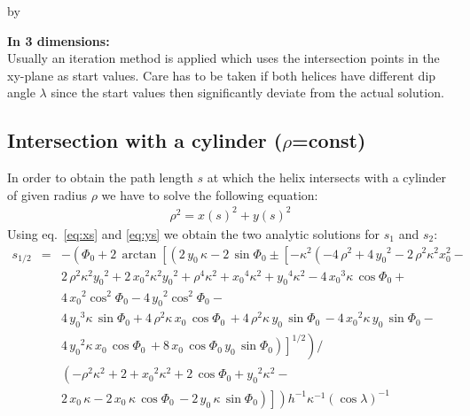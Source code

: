 \documentclass[twoside]{article}
\newcommand{\entrylabel}[1]{\mbox{\textbf{{#1}}}\hfil}%
\newenvironment{entry}
{\begin{list}{}%
    {\renewcommand{\makelabel}{\entrylabel}%
     \setlength{\labelwidth}{90pt}%
     \setlength{\leftmargin}{\labelwidth}
     \advance\leftmargin by \labelsep%
      }%
    }%
  {\end{list}}
\newcommand{\Entrylabel}[1]%
{\raisebox{0pt}[1ex][0pt]{\makebox[\labelwidth][l]%
    {\parbox[t]{\labelwidth}{\hspace{0pt}\textbf{{#1}}}}}}
\newenvironment{Entry}%
{\renewcommand{\entrylabel}{\Entrylabel}\begin{entry}}%
  {\end{entry}}
\begin{document}
\begin{description}
\begin{Entry}
{\bf In 3 dimensions:}\\
Usually an iteration method is applied which uses the intersection
points in the xy-plane as start values. Care has to be taken if both
helices have different dip angle $\lambda$ since the start values then
significantly deviate from the actual solution.

\subsection{Intersection with a cylinder ($\rho$=const)}

In order to obtain the path length $s$ at which the helix
intersects with a cylinder of given radius $\rho$ we have to solve
the following equation:
\begin{eqnarray}
    \rho^2 = x(s)^2 + y(s)^2
\end{eqnarray}
Using eq.~\ref{eq:xs} and \ref{eq:ys} we obtain the two analytic solutions for $s_1$ and $s_2$:
\begin{eqnarray} \label{eq:rsolve}
    s_{1/2} &=& -\left({\Phi_0}+2\,\arctan \left[
            \left(2\,{y_0}\,\kappa-2\,\sin{\Phi_0} \pm \left[ -
                    \kappa^2\left (-4\,\rho^2+4\,{y_0}^2 - 2\,\rho^2\kappa^2 x_0^2 -  
                    \right. \right. \right. \right. \right. \\ \nonumber
    & & \left. \left. \left. \left. \left.
                        2\,\rho^2 \kappa^2 {y_0}^{2} + 2\,{{x_0}}^{2}{\kappa}^{2}{
                            {y_0}}^{2}+{\rho}^{4}{\kappa}^{2}+{{x_0}}^{4}{\kappa}^{2}+{{y_0}}^{4}{
                            \kappa}^{2}-4\,{{x_0}}^{3}\kappa\,\cos{\Phi_0} +
                    \right. \right. \right. \right. \right. \\ \nonumber
    & & \left. \left. \left. \left. \left.
                        4\,{{x_0}}^{2}\cos^2{\Phi_0} - 4\,{{y_0}}^{2} \cos^{2}{\Phi_0} -
                    \right. \right. \right. \right. \right. \\ \nonumber
    & & \left. \left. \left. \left. \left.
                        4\,{{y_0}}
                        ^{3}\kappa\,\sin{\Phi_0}+4\,{\rho}^{2}\kappa\,{x_0}\,\cos{\Phi_0}\, + 4\,{\rho}^{2}\kappa
                        \,{y_0}\,\sin{\Phi_0}\, -4\,{{x_0}}^{2}\kappa\,{y_0}\,\sin{\Phi_0} -
                    \right. \right. \right. \right. \right. \\ \nonumber
    & & \left. \left. \left. \left. \left.
                        4\,{{y_0}}^{2}\kappa\,{x_0}\,\cos{\Phi_0}\, +8\,{x_0}\,\cos{\Phi_0}\,{y_0}\,\sin{\Phi_0}
                    \right ) \right]^{1/2} \right) /
        \right. \right. \\ \nonumber
    & & \left. \left.
            \left(
                -{\rho}^{2}{\kappa}^{2}+2+{x_0}^{2}{\kappa}^{2}+2\,\cos{\Phi_0}+{y_0}^{2}{\kappa}^{2} -
            \right. \right. \right. \\ \nonumber
    & & \left. \left. \left.
                2\,{x_0}\,\kappa-2\,{x_0}\,\kappa\,\cos{\Phi_0}\,
                -2\,{y_0}\,\kappa\,\sin{\Phi_0} \right)
        \right] \right){h}^{-1}{\kappa}^{-1}\left (
        \cos\lambda\right )^{-1}
\end{eqnarray}



\end{Entry}
\end{description}
\end{document}
